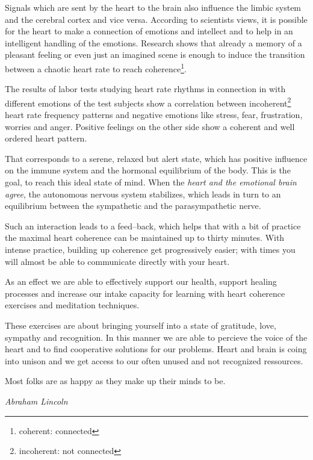 \documentclass[../main.tex]{subfiles}
\begin{document}
Signals which are sent by the heart to the brain also influence the limbic system and the cerebral cortex and vice versa.
According to scientists views, it is possible for the heart to make a connection of emotions and intellect and to help in an intelligent handling of the emotions.
Research shows that already a memory of a pleasant feeling or even just an imagined scene is enough to induce the transition between a chaotic heart rate to reach
coherence\footnote{coherent: connected}.

The results of labor tests studying heart rate rhythms in connection in with different emotions of the test subjects show a correlation between
incoherent\footnote{incoherent: not connected} heart rate frequency patterns and negative emotions like stress, fear, frustration, worries and anger.
Positive feelings on the other side show a coherent and well ordered heart pattern.

That corresponds to a serene, relaxed but alert state,
which has positive influence on the immune system and the hormonal equilibrium of the body.
This is the goal, to reach this ideal state of mind.
When the \emph{heart and the emotional brain agree}, the autonomous nervous system stabilizes,
which leads in turn to an equilibrium between the sympathetic and the parasympathetic nerve.

Such an interaction leads to a feed--back, which helps that with a bit of practice the maximal heart coherence can be maintained up to thirty minutes.
With intense practice, building up coherence get progressively easier; with times you will almost be able to communicate directly with your heart.

As an effect we are able to effectively support our health, support healing processes
and increase our intake capacity for learning with heart coherence exercises and meditation techniques.

These exercises are about bringing yourself into a state of
gratitude, love, sympathy and recognition.
In this manner we are able to percieve the voice of the heart and to find cooperative solutions for our problems.
Heart and brain is coing into unison and we get access to our often unused and not recognized ressources.

\epigraph{Most folks are as happy as they make up their minds to be.}{\textit{Abraham Lincoln}}
\end{document}
